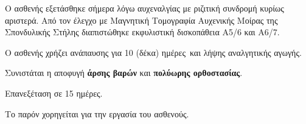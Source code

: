\documentclass[10pt,greek]{article}
\providecommand\LeaveDays{10 (δέκα) ημέρες}
\begin{document}
\begin{PatientInfo}
\end{PatientInfo}

Ο ασθενής εξετάσθηκε σήμερα λόγω αυχεναλγίας με ριζιτική συνδρομή κυρίως αριστερά.
Από τον έλεγχο με Μαγνητική Τομογραφία Αυχενικής Μοίρας της Σπονδυλικής Στήλης διαπιστώθηκε εκφυλιστική δισκοπάθεια Α5/6 και Α6/7.

Ο ασθενής χρήζει ανάπαυσης για \LeaveDays\ και λήψης αναλγητικής αγωγής.

Συνιστάται η αποφυγή \textbf{άρσης βαρών} και \textbf{πολύωρης ορθοστασίας}.

Επανεξέταση σε 15 ημέρες.


Το παρόν χορηγείται για την εργασία του ασθενούς.
\end{document}
